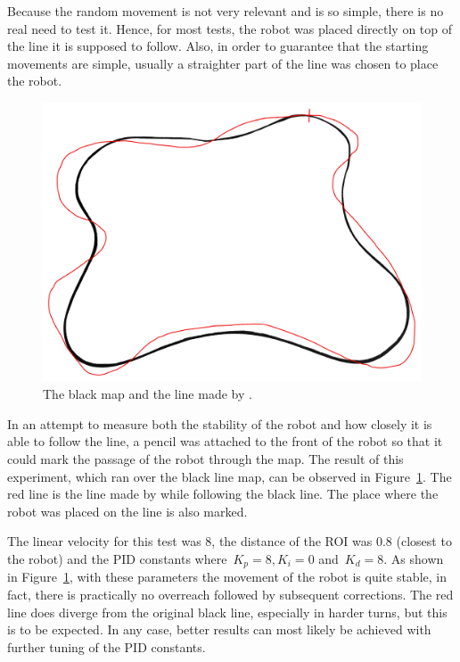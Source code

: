\documentclass[10pt,conference,compsoc]{IEEEtran}
\begin{document}
Because the random movement is not very relevant and is so simple, there is no real need to test it. Hence, for most tests, the robot was placed directly on top of the line it is supposed to follow. Also, in order to guarantee that the starting movements are simple, usually a straighter part of the line was chosen to place the robot.

\begin{figure}[thpb]
\centering
\includegraphics[scale=0.06]{img/result.png}
\caption{The black map and the line made by \robobo.}
\label{fig:result}
\end{figure}

In an attempt to measure both the stability of the robot and how closely it is able to follow the line, a pencil was attached to the front of the robot so that it could mark the passage of the robot through the map. The result of this experiment, which ran over the black line map, can be observed in Figure~\ref{fig:result}. The red line is the line made by \robobo while following the black line. The place where the robot was placed on the line is also marked.

The linear velocity for this test was 8, the distance of the ROI was 0.8 (closest to the robot) and the PID constants where~$K_p = 8, K_i = 0$ and~$K_d = 8$. As shown in Figure~\ref{fig:result}, with these parameters the movement of the robot is quite stable, in fact, there is practically no overreach followed by subsequent corrections. The red line does diverge from the original black line, especially in harder turns, but this is to be expected. In any case, better results can most likely be achieved with further tuning of the PID constants.
\end{document}
